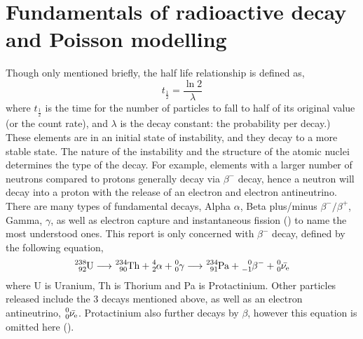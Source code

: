 \documentclass[11pt]{article}
\begin{document}
    \section{Fundamentals of radioactive decay and Poisson modelling}
Though only mentioned briefly, the half life relationship is defined as,
\begin{equation}
        t_{\frac{1}{2}} = \frac{\ln{2}}{\lambda}
    \end{equation}
where $ t_{\frac{1}{2}}$ is the time for the number of particles to fall to half of its original value (or the count rate), and $\lambda$ is the decay constant: the probability per decay.\cite{YF}) \\
These elements are in an initial state of instability, and they decay to a more stable state. The nature of the instability and the structure of the atomic nuclei determines the type of the decay. For example, elements with a larger number of neutrons compared to protons generally decay via $\beta^{-}$ decay, hence a neutron will decay into a proton with the release of an electron and electron antineutrino. \\
There are many types of fundamental decays, Alpha $\alpha$, Beta plus/minus $\beta^{-}/\beta^{+}$, Gamma, $\gamma$, as well as electron capture and instantaneous fission (\cite{Magill2005}) to name the most understood ones. This report is only concerned with $\beta^{-}$ decay, defined by the following equation,
    \begin{equation}
    \ce{^{238}_{92}U} \longrightarrow \ce{^{234}_{90}Th} + \ce{^{4}_{2}\alpha} + \ce{^{0}_{0}\gamma} \longrightarrow \ce{^{234}_{91}Pa} + \ce{^{0}_{-1}\beta^{-}} + \ce{^{0}_{0}\bar{\nu_{e}}}
\end{equation}
where U is Uranium, Th is Thorium and Pa is Protactinium. Other particles released include the 3 decays mentioned above, as well as an electron antineutrino, $\ce{^{0}_{0}\bar{\nu_{e}}}$. Protactinium also further decays by $\beta$, however this equation is omitted here (\cite{arazo2016uranium}). \\
\end{document}

